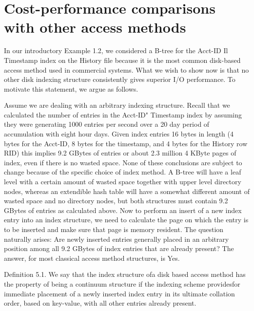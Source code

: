 \documentclass[a4paper,12pt,notitlepage,twoside,openright]{article}
\begin{document}
\hypertarget{cost-performance-comparisons-with-other-access-methods}{%
\section{Cost-performance comparisons with other access
methods}\label{cost-performance-comparisons-with-other-access-methods}}


In our introductory Example 1.2, we considered a B-tree for the Acct-ID
Il Timestamp index on the History file because it is the most common
disk-based access method used in commercial systems. What we wish to
show now is that no other disk indexing structure consistently gives
superior I/O performance. To motivate this statement, we argue as
follows.

Assume we are dealing with an arbitrary indexing structure. Recall that
we calculated the number of entries in the Acct-ID" Timestamp index by
assuming they were generating 1000 entries per second over a 20 day
period of accumulation with eight hour days. Given index entries 16
bytes in length (4 bytes for the Acct-ID, 8 bytes for the timestamp, and
4 bytes for the History row RID) this implies 9.2 GBytes of entries or
about 2.3 million 4 KByte pages of index, even if there is no wasted
space. None of these conclusions are subject to change because of the
specific choice of index method. A B-tree will have a leaf level with a
certain amount of wasted space together with upper level directory
nodes, whereas an extendible hash table will have a somewhat different
amount of wasted space and no directory nodes, but both structures must
contain 9.2 GBytes of entries as calculated above. Now to perform an
insert of a new index entry into an index structure, we need to
calculate the page on which the entry is to be inserted and make sure
that page is memory resident. The question naturally arises: Are newly
inserted entries generally placed in an arbitrary position among all 9.2
GBytes of index entries that are already present? The answer, for most
classical access method structures, is Yes.

Definition 5.1. We say that the index structure ofa disk based access
method has the property of being a continuum structure if the indexing
scheme providesfor immediate placement of a newly inserted index entry
in its ultimate collation order, based on key-value, with all other
entries already present.
\end{document}
